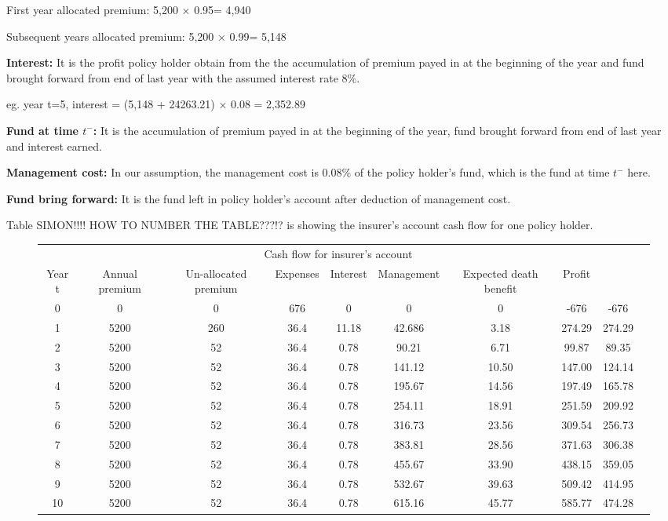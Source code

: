 \documentclass{report}
\begin{document}
First year allocated premium:                5,200 $\times$ 0.95= 4,940

Subsequent years allocated premium:   5,200 $\times$ 0.99= 5,148

\textbf{Interest:} It is the profit policy holder obtain from the the accumulation of premium payed in at the beginning of the year and fund brought forward from end of last year with the assumed interest rate 8\%.

eg.  year t=5, interest = (5,148 + 24263.21) $\times$ 0.08 = 2,352.89

\textbf{Fund at time $t^-$:} It is the accumulation of premium payed in at the beginning of the year, fund brought forward from end of last year and interest earned.

\textbf{Management cost:} In our assumption, the management cost is 0.08\% of the policy holder's fund, which is the fund at time $t^-$ here. 

\textbf{Fund bring forward:} It is the fund left in policy holder's account after deduction of management cost. 


Table SIMON!!!! HOW TO NUMBER THE TABLE???!? is showing the insurer's account cash flow for one policy holder. 


\begin{figure}[ht]
\hfill
\begin{tabular}{c c c c c c c c c c}
\toprule
\multicolumn{9}{c}{Cash flow for insurer's account} \\
\cmidrule(r){3-7}

Year t & Annual premium & Un-allocated premium & Expenses & Interest &Management & Expected death benefit & Profit  \\
\midrule

0&0&0&676&0&0&0&-676&-676\\
1&5200&260&36.4&11.18&42.686&3.18&274.29&274.29\\
2&5200&52&36.4&0.78&90.21&6.71&99.87&89.35\\
3&5200&52&36.4&0.78&141.12&10.50&147.00&124.14\\
4&5200&52&36.4&0.78&195.67&14.56&197.49&165.78\\
5&5200&52&36.4&0.78&254.11&18.91&251.59&209.92\\
6&5200&52&36.4&0.78&316.73&23.56&309.54&256.73\\
7&5200&52&36.4&0.78&383.81&28.56&371.63&306.38\\
8&5200&52&36.4&0.78&455.67&33.90&438.15&359.05\\
9&5200&52&36.4&0.78&532.67&39.63&509.42&414.95\\
10&5200&52&36.4&0.78&615.16&45.77&585.77&474.28\\

\bottomrule
\end{tabular}
\end{figure}
\end{document}
